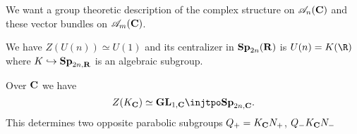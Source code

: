 We want a group theoretic description of the complex structure on $\mathscr{A}_n(\mathbf{C})$ and these vector bundles on $\mathscr{A}_m(\mathbf{C})$.

We have $Z(U(n))\simeq U(1)$ and its centralizer in $\mathbf{Sp}_{2n}(\mathbf{R})$ is $U(n)=K(\R)$ where $K\hookrightarrow \mathbf{Sp}_{2n,\mathbf{R}}$ is an algebraic subgroup.

Over $\mathbf{C}$ we have
\[
	Z(K_{\bb{C}}) \simeq \GL_{1,\bb{C}} \injtpo \Sp_{2n,\bb{C}}.
\] 
This determines two opposite parabolic subgroups $Q_+=K_{\mathbf{C}}N_+$, $Q_{-}K_{\mathbf{C}}N_-$


